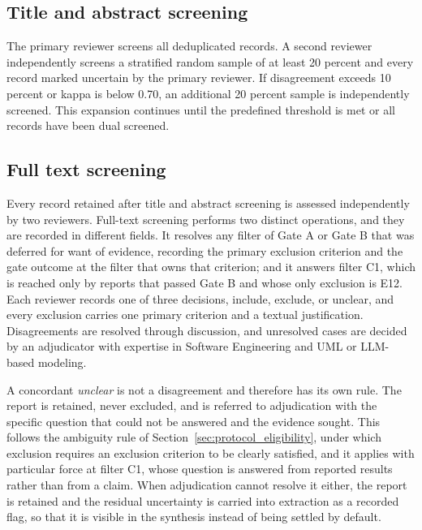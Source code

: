 \subsection{Title and abstract screening}

The primary reviewer screens all deduplicated records. A second reviewer independently screens a stratified random sample of at least 20 percent and every record marked uncertain by the primary reviewer. If disagreement exceeds 10 percent or kappa is below 0.70, an additional 20 percent sample is independently screened. This expansion continues until the predefined threshold is met or all records have been dual screened.

\subsection{Full text screening}

Every record retained after title and abstract screening is assessed independently by two reviewers. Full-text screening performs two distinct operations, and they are recorded in different fields. It resolves any filter of Gate A or Gate B that was deferred for want of evidence, recording the primary exclusion criterion and the gate outcome at the filter that owns that criterion; and it answers filter C1, which is reached only by reports that passed Gate B and whose only exclusion is E12. Each reviewer records one of three decisions, include, exclude, or unclear, and every exclusion carries one primary criterion and a textual justification. Disagreements are resolved through discussion, and unresolved cases are decided by an adjudicator with expertise in Software Engineering and UML or LLM-based modeling.

A concordant \textit{unclear} is not a disagreement and therefore has its own rule. The report is retained, never excluded, and is referred to adjudication with the specific question that could not be answered and the evidence sought. This follows the ambiguity rule of Section~\ref{sec:protocol_eligibility}, under which exclusion requires an exclusion criterion to be clearly satisfied, and it applies with particular force at filter C1, whose question is answered from reported results rather than from a claim. When adjudication cannot resolve it either, the report is retained and the residual uncertainty is carried into extraction as a recorded flag, so that it is visible in the synthesis instead of being settled by default.

